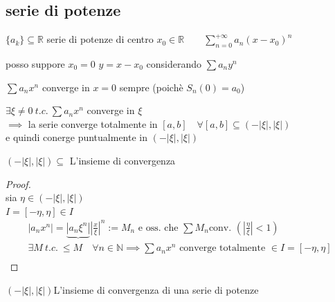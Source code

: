 \documentclass[a4paper, oneside]{article}
\begin{document}
\subsection{serie di potenze}
\begin{definition}
  $\{a_k\} \subseteq \mathbb{R}$ serie di potenze di centro $x_0 \in \mathbb{R} \qquad \sum_{n=0}^{+\infty} a_n (x - x_0)^n$
\end{definition}
\begin{observation}
  posso suppore $x_0=0$ $y=x-x_0$ considerando $\sum a_n y^n$
\end{observation}
\begin{observation}
  $\sum a_n x^n$ converge in $x=0$ \small sempre (poichè $S_n(0) = a_0$)\normalsize
\end{observation}
\begin{theorem}
  $\exists \xi \neq 0 \ t.c. \ \sum a_n x^n $ converge in $\xi$\\
  $\implies$ la serie converge totalmente in $[a,b] \quad \forall [a,b] \subseteq (-|\xi|, |\xi|)$\\
  e quindi conerge puntualmente in $(-|\xi|, |\xi|)$
\end{theorem}
\begin{observation}
  $(-|\xi|, |\xi|) \subseteq$ L'insieme di convergenza
\end{observation}
\begin{proof}
  \hfil\\
  sia $\eta \in (-|\xi|, |\xi|)$\\
  $I = [-\eta, \eta] \in I$\\
  \begin{gather*}
    \left\lvert a_n x^n \right\rvert = \underbrace{\left\lvert a_n \xi^n \right\rvert} \left\lvert \frac{x}{\xi} \right\rvert^n := M_n \text{ e oss. che } \sum M_n \text{conv. } \left(\left\lvert \frac{\eta}{\xi}\right\rvert  < 1 \right) \\
    \exists M \ t.c. \ \leq M \quad \forall n \in \mathbb{N}
    \implies \sum a_n x^n \text{ converge totalmente } \in I = [-\eta, \eta] \\
  \end{gather*}
\end{proof}

\begin{observation}
  $\left(-|\xi|, |\xi|\right) $L'insieme di convergenza di una serie di potenze
\end{observation}
\end{document}
